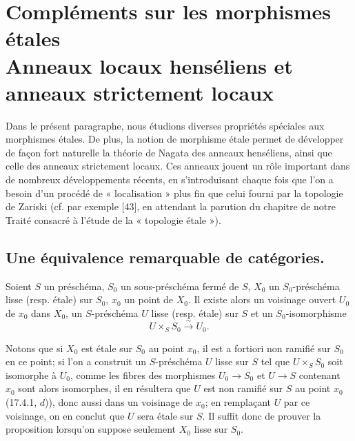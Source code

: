 \section[Compléments sur les morphismes étales. Anneaux locaux henséliens et anneaux strictement locaux]{Compléments sur les morphismes étales\\Anneaux locaux henséliens et anneaux strictement locaux}
\label{section:IV.18}

Dans le présent paragraphe, nous étudions diverses propriétés spéciales aux morphismes étales. De plus, la notion de morphisme étale permet de développer de façon fort naturelle la théorie de Nagata des anneaux henséliens, ainsi que celle des anneaux strictement locaux. Ces anneaux jouent un rôle important dans de nombreux développements récents, en s'introduisant chaque fois que l'on a besoin d'un procédé de « localisation » plus fin que celui fourni par la topologie de Zariski (cf. par exemple [43], en attendant la parution du chapitre de notre Traité consacré à l'étude de la « topologie étale »).

\subsection{Une équivalence remarquable de catégories.}
\label{subsection:IV.18.1}

\begin{proposition}[18.1.1]
\label{IV.18.1.1}
Soient $S$ un préschéma, $S_0$ un sous-préschéma fermé de $S$, $X_0$ un $S_0$-préschéma lisse (resp. étale) sur $S_0$, $x_0$ un point de $X_0$. Il existe alors un voisinage ouvert $U_0$ de $x_0$ dans $X_0$, un $S$-préschéma $U$ lisse (resp. étale) sur $S$ et un $S_0$-isomorphisme
\[
  U\times_S S_0\xrightarrow{\sim}U_0.
\]
\end{proposition}

Notons que si $X_0$ est étale sur $S_0$ au point $x_0$, il est a fortiori non ramifié sur $S_0$ en ce point; si l'on a construit un $S$-préschéma $U$ lisse sur $S$ tel que $U\times_S S_0$ soit isomorphe à $U_0$, comme les fibres des morphismes $U_0\to S_0$ et $U\to S$ contenant $x_0$ sont alors isomorphes, il en résultera que $U$ est non ramifié sur $S$ au point $x_0$ (17.4.1, $d$)), donc aussi dans un voisinage de $x_0$; en remplaçant $U$ par ce voisinage, on en conclut que $U$ sera étale sur $S$. Il suffit donc de prouver la proposition lorsqu'on suppose seulement $X_0$ lisse sur $S_0$.

